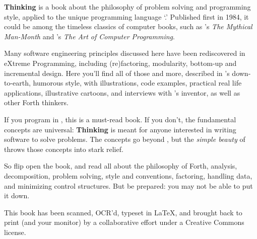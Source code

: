
\noindent
\textbf{Thinking \Forth{}} is a book about the philosophy of problem
solving and programming style, applied to the unique programming
language `\Forth{}.' Published first in 1984, it could be among the
timeless classics of computer books, such as 's
\emph{The Mythical Man-Month} and 's \emph{The
Art of Computer Programming}.

Many software engineering principles discussed here have been
rediscovered in eXtreme Programming, including (re)factoring,
modularity, bottom-up and incremental design.  Here you'll find all of
those and more, described in 's down-to-earth,
humorous style, with illustrations, code examples, practical real life
applications, illustrative cartoons, and interviews with \Forth{}'s
inventor,  as well as other Forth thinkers.

If you program in \Forth{}, this is a must-read book.  If you don't,
the fundamental concepts are universal: \textbf{Thinking \Forth{}} is
meant for anyone interested in writing software to solve problems.
The concepts go beyond \Forth{}, but the \emph{simple beauty} of
\Forth{} throws those concepts into stark relief.

So flip open the book, and read all about the philosophy of Forth,
analysis, decomposition, problem solving, style and conventions,
factoring, handling data, and minimizing control structures.  But be
prepared: you may not be able to put it down.

\medskip
This book has been scanned, OCR'd, typeset in \LaTeX{}, and brought
back to print (and your monitor) by a collaborative effort under a Creative
Commons license.


